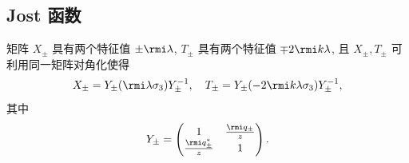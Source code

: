 \subsection{Jost 函数}
矩阵 $ X_{\pm} $ 具有两个特征值 $ \pm \rmi \lambda $, $ T_{\pm} $ 具有两个特征值 $ \mp 2\rmi k \lambda $, 且 $ X_{\pm}, T_{\pm} $ 可利用同一矩阵对角化使得
\begin{equation}
    X_{\pm} = Y_{\pm} (\rmi \lambda \sigma_{3}) Y_{\pm}^{-1}, \quad T_{\pm} = Y_{\pm} (-2 \rmi k \lambda \sigma_{3}) Y_{\pm}^{-1},
    \label{ch5-eq-xt-diag}
\end{equation}
其中
\begin{equation}
    Y_{\pm} = \begin{pmatrix}
        1                          & \frac{\rmi q_{\pm}}{z} \\
        \frac{\rmi q_{\pm}^{*}}{z} & 1
    \end{pmatrix}.
\end{equation}
